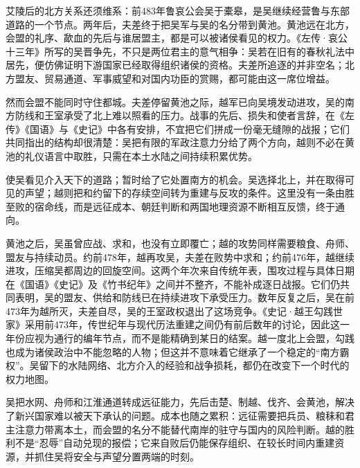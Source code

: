 艾陵后的北方关系还须维系：前483年鲁哀公会吴于橐皋，是吴继续经营鲁与东部道路的一个节点。两年后，夫差终于把吴军与吴的名分带到黄池。黄池远在北方，会盟的礼序、歃血的先后与谁居盟主，都是可以被诸侯看见的权力。《左传·哀公十三年》所写的吴晋争先，不只是两位君主的意气相争：吴若在旧有的春秋礼法中居先，便仿佛证明下游国家已经取得组织诸侯的资格。夫差所追逐的并非空名；北方盟友、贸易通道、军事威望和对国内功臣的赏赐，都可能由这一席位增益。

然而会盟不能同时守住都城。夫差停留黄池之际，越军已向吴境发动进攻，吴的南方防线和王室承受了北上难以照看的压力。战事的先后、损失和使者言辞，在《左传》《国语》与《史记》中各有安排，不宜把它们拼成一份毫无缝隙的战报；它们共同指出的结构却很清楚：吴把有限的军政注意力分给了两个方向，越则不必在黄池的礼仪语言中取胜，只需在本土水陆之间持续积累优势。

\begin{causalchain}[从郢都到姑苏]
使吴看见介入天下的道路；暂时给了它处置南方的机会。吴选择北上，并在取得可见的声望；越则把和约留下的存续空间转为重建与反攻的条件。这里没有一条由胜至败的宿命线，而是远征成本、朝廷判断和两国地理资源不断相互反馈，终于通向。
\end{causalchain}

黄池之后，吴虽曾应战、求和，也没有立即覆亡；越的攻势同样需要粮食、舟师、盟友与持续动员。约前478年，越再攻吴，夫差在败势中求和；约前476年，越继续进攻，压缩吴都周边的回旋空间。这两个年次来自传统年表，围攻过程与具体日期在《国语》《史记》及《竹书纪年》之间并不整齐，不能补成逐日战报。它们仍共同表明，吴的盟友、供给和防线已在持续进攻下承受压力。数年反复之后，吴在前473年为越所灭，夫差自尽，吴的王室政权退出了这场竞争。《史记·越王勾践世家》采用前473年，传世纪年与现代历法重建之间仍有前后数年的讨论，因此这一年份应视为通行的编年节点，而不是能精确到某日的结案。越一度北上会盟，勾践也成为诸侯政治中不能忽略的人物；但这并不意味着它继承了一个稳定的“南方霸权”。吴留下的水陆网络、北方介入的经验和战争损耗，都仍在改变下一个时代的权力地图。

\begin{turningpoint}
吴把水网、舟师和江淮通道转成远征能力，先后击楚、制越、伐齐、会黄池，解决了新兴国家难以被天下承认的问题。成本也随之累积：远征需要把兵员、粮秣和君主注意力带离本土，而会盟的名分不能替代南岸的驻守与国内的风险判断。越的胜利不是“忍辱”自动兑现的报偿；它来自败后仍能保存组织、在较长时间内重建资源，并抓住吴将安全与声望分置两端的时刻。
\end{turningpoint}

